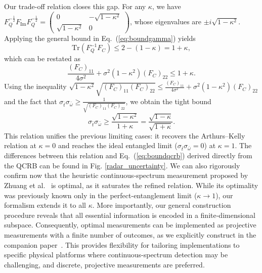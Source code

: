 \documentclass[
aps,
prl,
twocolumn,

superscriptaddress]{revtex4-2}
\begin{document}
Our trade-off relation closes this gap. For any $\kappa$, we have $F_Q^{-\frac{1}{2}}F_{\text{Im}}F_Q^{-\frac{1}{2}}=\left(\begin{matrix}
     0 & -\sqrt{1-\kappa^2} \\ \sqrt{1-\kappa^2} & 0
   \end{matrix}\right)$, whose eigenvalues are $\pm i\sqrt{1-\kappa^2}$. Applying the general bound in Eq.~(\ref{eq:boundgamma}) yields
\begin{equation}
    \text{Tr}(F_Q^{-1}F_C) \leq 2 - (1- \kappa) = 1+\kappa ,
\end{equation}
which can be restated as \[\frac{(F_C)_{11}}{4\sigma^2}+\sigma^2(1-\kappa^2)(F_C)_{22}\leq 1+\kappa.\]
Using the inequality $\sqrt{1-\kappa^2}\sqrt{(F_C)_{11}(F_C)_{22}}\leq \frac{(F_C)_{11}}{4\sigma^2}+\sigma^2(1-\kappa^2)(F_C)_{22} $ and the fact that $\sigma_{\bar{t}}\sigma_{\bar{\omega}}\geq \frac{1}{\sqrt{(F_C)_{11}(F_C)_{22}}}$, we obtain the tight bound
\begin{equation}
\sigma_{\bar{t}}\sigma_{\bar{\omega}} \geq \frac{\sqrt{1-\kappa^2}}{1+\kappa}=\frac{\sqrt{1-\kappa}}{\sqrt{1+\kappa}}.
\end{equation}
This relation unifies the previous limiting cases: it recovers the Arthurs–Kelly relation at $\kappa=0$ and reaches the ideal entangled limit ($\sigma_{\bar{t}}\sigma_{\bar{\omega}}=0$) at $\kappa=1$. The differences between this relation and Eq.~(\ref{eq:boundqcrb}) derived directly from the QCRB can be found in Fig. \ref{radar_uncertainty}. We can also rigorously confirm now that the heuristic continuous‑spectrum measurement proposed by Zhuang et al.~\cite{zhuang2017,huang2021} is optimal, as it saturates the refined relation. While its optimality was previously known only in the perfect-entanglement limit ($\kappa \to 1$), our formalism extends it to all $\kappa$. More importantly, our general construction procedure reveals that all essential information is encoded in a finite‑dimensional subspace. Consequently, optimal measurements can be implemented as projective measurements with a finite number of outcomes, as we explicitly construct in the companion paper~\cite{pra}. This provides flexibility for tailoring implementations to specific physical platforms where continuous-spectrum detection may be challenging, and discrete, projective measurements are preferred.
\end{document}
